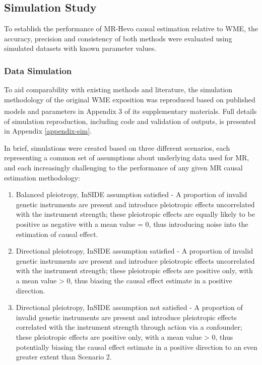 \documentclass[
]{article}
\begin{document}
\subsection{Simulation Study}\label{simulation-study}

To establish the performance of MR-Hevo causal estimation relative to WME, the accuracy, precision and consistency of both methods were evaluated using simulated datasets with known parameter values.

\subsubsection{Data Simulation}\label{data-simulation}

To aid comparability with existing methods and literature, the simulation methodology of the original WME exposition was reproduced based on published models and parameters in Appendix 3 of its supplementary materials\textsuperscript{}. Full details of simulation reproduction, including code and validation of outputs, is presented in Appendix \ref{appendix-sim}.

In brief, simulations were created based on three different scenarios, each representing a common set of assumptions about underlying data used for MR, and each increasingly challenging to the performance of any given MR causal estimation methodology:

\begin{enumerate}
\def\labelenumi{\arabic{enumi}.}
\item
  Balanced pleiotropy, InSIDE assumption satisfied - A proportion of invalid genetic instruments are present and introduce pleiotropic effects uncorrelated with the instrument strength; these pleiotropic effects are equally likely to be positive as negative with a mean value = 0, thus introducing noise into the estimation of causal effect.
\item
  Directional pleiotropy, InSIDE assumption satisfied - A proportion of invalid genetic instruments are present and introduce pleiotropic effects uncorrelated with the instrument strength; these pleiotropic effects are positive only, with a mean value \textgreater{} 0, thus biasing the causal effect estimate in a positive direction.
\item
  Directional pleiotropy, InSIDE assumption not satisfied - A proportion of invalid genetic instruments are present and introduce pleiotropic effects correlated with the instrument strength through action via a confounder; these pleiotropic effects are positive only, with a mean value \textgreater{} 0, thus potentially biasing the causal effect estimate in a positive direction to an even greater extent than Scenario 2.
\end{enumerate}
\end{document}
